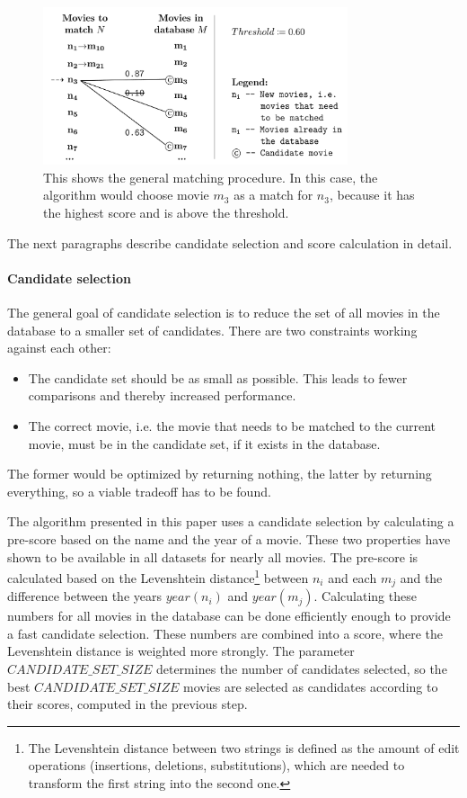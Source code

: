 \begin{figure}[ht]
  \begin{center}
  \includegraphics[width=0.8\textwidth]{images/matching_general.pdf}
  \end{center}
  \caption{This shows the general matching procedure. In this case, the algorithm would choose movie $m_3$ as a match for $n_3$, because it has the highest score and is above the threshold.}
  \label{fig_matching_general}
\end{figure}

The next paragraphs describe candidate selection and score calculation in detail.

\paragraph{Candidate selection}

The general goal of candidate selection is to reduce the set of all movies in the database to a smaller set of candidates.
There are two constraints working against each other:
\begin{itemize}
	\item The candidate set should be as small as possible. This leads to fewer comparisons and thereby increased performance.
	\item The correct movie, i.e. the movie that needs to be matched to the current movie, must be in the candidate set, if it exists in the database.
\end{itemize}
The former would be optimized by returning nothing, the latter by returning everything, so a viable tradeoff has to be found.

The algorithm presented in this paper uses a candidate selection by calculating a pre-score based on the name and the year of a movie.
These two properties have shown to be available in all datasets for nearly all movies.
The pre-score is calculated based on the Levenshtein distance\footnote{The Levenshtein distance between two strings is defined as the amount of edit operations (insertions, deletions, substitutions), which are needed to transform the first string into the second one.} between $n_i$ and each $m_j$ and the difference between the years $year(n_i)$ and $year(m_j)$.
Calculating these numbers for all movies in the database can be done efficiently enough to provide a fast candidate selection.
These numbers are combined into a score, where the Levenshtein distance is weighted more strongly.
The parameter $CANDIDATE\_SET\_SIZE$ determines the number of candidates selected, so the best $CANDIDATE\_SET\_SIZE$ movies are selected as candidates according to their scores, computed in the previous step.

